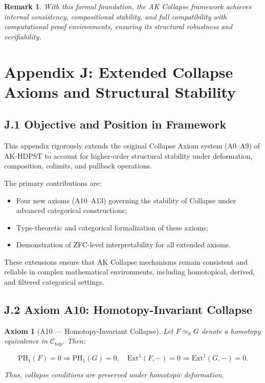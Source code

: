\documentclass[11pt]{article}
\newtheorem{remark}[theorem]{Remark}
\newtheorem{axiom}{Axiom}[section]
\begin{document}
\begin{remark}
With this formal foundation, the AK Collapse framework achieves internal consistency, compositional stability, and full compatibility with computational proof environments, ensuring its structural robustness and verifiability.
\end{remark}



\section*{Appendix J: Extended Collapse Axioms and Structural Stability}

\subsection*{J.1 Objective and Position in Framework}

This appendix rigorously extends the original Collapse Axiom system (A0–A9) of AK-HDPST to account for higher-order structural stability under deformation, composition, colimits, and pullback operations.

The primary contributions are:

\begin{itemize}
    \item Four new axioms (A10–A13) governing the stability of Collapse under advanced categorical constructions;
    \item Type-theoretic and categorical formalization of these axioms;
    \item Demonstration of ZFC-level interpretability for all extended axioms.
\end{itemize}

These extensions ensure that AK Collapse mechanisms remain consistent and reliable in complex mathematical environments, including homotopical, derived, and filtered categorical settings.

\subsection*{J.2 Axiom A10: Homotopy-Invariant Collapse}

\begin{axiom}[A10 — Homotopy-Invariant Collapse]
Let \( F \simeq_h G \) denote a homotopy equivalence in \( \mathcal{C}_{\mathrm{top}} \). Then:

\[
\mathrm{PH}_1(F) = 0 \Rightarrow \mathrm{PH}_1(G) = 0,
\quad \mathrm{Ext}^1(F, -) = 0 \Rightarrow \mathrm{Ext}^1(G, -) = 0.
\]

Thus, collapse conditions are preserved under homotopic deformation.
\end{axiom}
\end{document}
